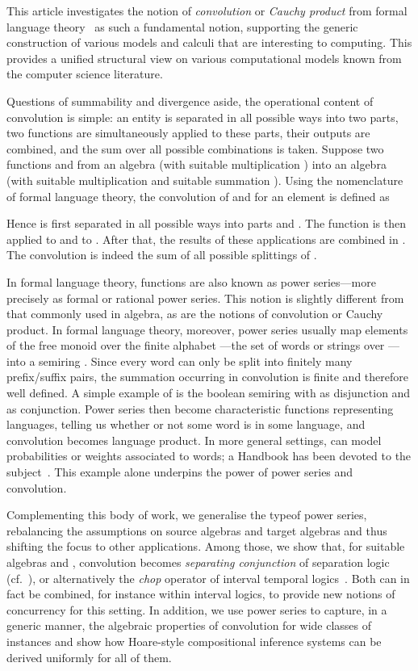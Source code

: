 \documentclass[12pt]{article}
\theoremstyle{definition}
\begin{document}
This article investigates the notion of \emph{convolution} or
\emph{Cauchy product} from formal language
theory~\cite{Handbook,BerstelReutenauer} as such a fundamental
notion, supporting the generic construction of various models and
calculi that are interesting to computing. This provides a unified
structural view on various computational models known from the
computer science literature.

Questions of summability and divergence aside, the operational content
of convolution is simple: an entity is separated in all possible ways
into two parts, two functions are simultaneously applied to these
parts, their outputs are combined, and the sum over all possible
combinations is taken. Suppose two functions  and  from an
algebra  (with suitable multiplication ) into an algebra 
(with suitable multiplication  and suitable summation ). Using the nomenclature of formal language theory, the
convolution of  and  for an element  is  defined as

Hence  is first separated in all possible ways into parts  and
. The function  is then applied to  and  to . After
that, the results of these applications are combined in . The
convolution is indeed the sum of all possible splittings of . 


In formal language theory, functions  are also known as
power series---more precisely as formal or rational power series. This
notion is slightly different from that commonly used in algebra, as
are the notions of convolution or Cauchy product. In formal language theory,
moreover, power series usually map elements of the free monoid
 over the finite alphabet ---the set of words or strings
over ---into a semiring . Since every word can only
be split into finitely many prefix/suffix pairs, the summation
occurring in convolution is finite and therefore well defined.  A
simple example of  is the boolean semiring with  as disjunction
and  as conjunction. Power series then become characteristic
functions representing languages, telling us whether or not some word
is in some language, and convolution becomes language product. In more
general settings,  can model probabilities or weights associated
to words; a Handbook has been devoted to the
subject~\cite{Handbook}. This example alone underpins the power of
power series and convolution.

Complementing this body of work, we generalise the typeof power
series, rebalancing the assumptions on source algebras  and target
algebras  and thus shifting the focus to other applications.  Among
those, we show that, for suitable algebras  and , convolution
becomes \emph{separating conjunction} of separation logic
(cf.~\cite{COY07}), or alternatively the \emph{chop} operator of
interval temporal logics~\cite{Mos00}. Both can in fact be combined,
for instance within interval logics, to provide new notions of
concurrency for this setting. In addition, we use power series to
capture, in a generic manner, the algebraic properties of convolution
for wide classes of instances and show how Hoare-style compositional
inference systems can be derived uniformly for all of them.
\end{document}
